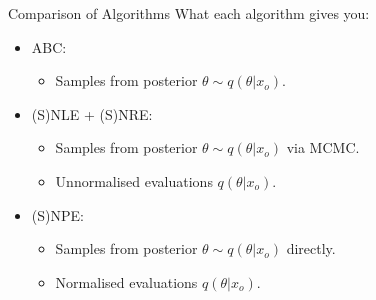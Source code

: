 \documentclass[12pt, aspectratio=169]{beamer}
\let\olditem\item
\renewcommand\item{\olditem\justifying}
\begin{document}
\begin{frame}{Comparison of Algorithms}
What each algorithm gives you:
\pause
\begin{itemize}
    \item ABC: 
    \begin{itemize}
        \item Samples from posterior $\theta \sim q(\theta|x_o)$.
    \end{itemize}
    
    \pause
    
    \item (S)NLE + (S)NRE:
    \begin{itemize}
        \item Samples from posterior $\theta \sim q(\theta|x_o)$ via MCMC.
        \item Unnormalised evaluations $q(\theta|x_o)$.
    \end{itemize}
    
    \pause
    
    \item (S)NPE:
    \begin{itemize}
        \item Samples from posterior $\theta \sim q(\theta|x_o)$ directly.
        \item Normalised evaluations $q(\theta|x_o)$.
    \end{itemize}
    
\end{itemize}
\end{frame}
\end{document}
